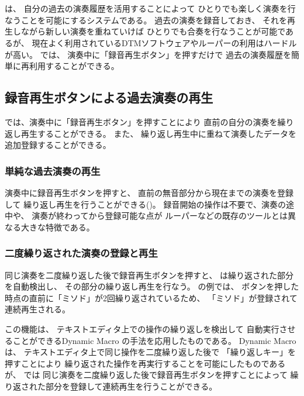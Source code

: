 %
%
\section{\system}
\label{repiano}

{\system}は、
自分の過去の演奏履歴を活用することによって
ひとりでも楽しく演奏を行なうことを可能にするシステムである。
%
過去の演奏を録音しておき、
それを再生しながら新しい演奏を重ねていけば
ひとりでも合奏を行なうことが可能であるが、
現在よく利用されているDTMソフトウェアやルーパーの利用はハードルが高い。
{\system}では、
演奏中に「録音再生ボタン」を押すだけで
過去の演奏履歴を簡単に再利用することができる。

\subsection{録音再生ボタンによる過去演奏の再生}
\label{recplaybutton}

{\system}では、演奏中に「録音再生ボタン」を押すことにより
直前の自分の演奏を繰り返し再生することができる。
また、
繰り返し再生中に重ねて演奏したデータを
追加登録することができる。

\subsubsection{単純な過去演奏の再生}

演奏中に録音再生ボタンを押すと、
直前の無音部分から現在までの演奏を登録して
繰り返し再生を行うことができる()。
%
録音開始の操作は不要で、演奏の途中や、
演奏が終わってから登録可能な点が
ルーパーなどの既存のツールとは異なる大きな特徴である。

\subsubsection{二度繰り返された演奏の登録と再生}

同じ演奏を二度繰り返した後で録音再生ボタンを押すと、
{\system}は繰り返された部分を自動検出し、
その部分の繰り返し再生を行なう。
の例では、
ボタンを押した時点の直前に「ミソド」が2回繰り返されているため、
「ミソド」が登録されて連続再生される。

この機能は、
テキストエディタ上での操作の繰り返しを検出して
自動実行させることができるDynamic Macro\cite{masui}
の手法を応用したものである。
Dynamic Macroは、
テキストエディタ上で同じ操作を二度繰り返した後で
「繰り返しキー」を押すことにより
繰り返された操作を再実行することを可能にしたものであるが、
{\system}では
同じ演奏を二度繰り返した後で録音再生ボタンを押すことによって
繰り返された部分を登録して連続再生を行うことができる。

